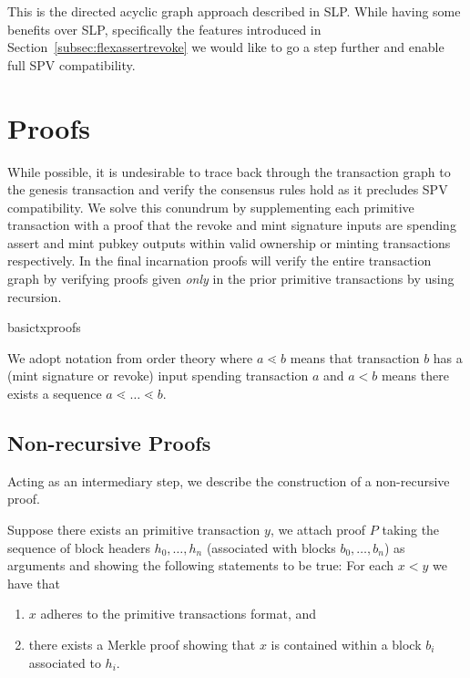 \documentclass[9pt,oneside]{amsart}
\begin{document}
This is the directed acyclic graph approach described in SLP. While having some benefits over SLP, specifically the features introduced in Section~\ref{subsec:flexassertrevoke} we would like to go a step further and enable full SPV compatibility.
    
\section{Proofs}
While possible, it is undesirable to trace back through the transaction graph to the genesis transaction and verify the consensus rules hold as it precludes SPV compatibility. We solve this conundrum by supplementing each primitive transaction with a proof that the revoke and mint signature inputs are spending assert and mint pubkey outputs within valid ownership or minting transactions respectively. In the final incarnation proofs will verify the entire transaction graph by verifying proofs given \emph{only} in the prior primitive transactions by using recursion.

\begin{center}
    {basictxproofs}
\end{center}

We adopt notation from order theory where $a \lessdot b$ means that transaction $b$ has a (mint signature or revoke) input spending transaction $a$ and $a < b$ means there exists a sequence $a \lessdot \dots \lessdot b$.
\subsection{Non-recursive Proofs}
Acting as an intermediary step, we describe the construction of a non-recursive proof.


Suppose there exists an primitive transaction $y$, we attach proof $P$ taking the sequence of block headers $h_{0}, \dots, h_{n}$ (associated with blocks $b_{0}, \dots, b_{n}$) as arguments and showing the following statements to be true:
For each $x < y$ we have that
\begin{enumerate}
    \item $x$ adheres to the primitive transactions format, and
    \item there exists a Merkle proof showing that $x$ is contained within a block $b_{i}$ associated to $h_{i}$.
\end{enumerate}
\end{document}
